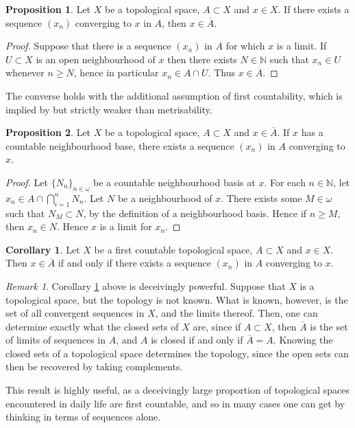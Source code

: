 \documentclass{book}
\theoremstyle{definition}
\newtheorem{proposition}{Proposition}[section]
\newtheorem{corollary}{Corollary}[theorem]
\theoremstyle{remark}
\newtheorem{remark}{Remark}[section]
\newcommand{\N}{\mathbb{N}}
\begin{document}
\begin{proposition}
Let $X$ be a topological space, $A\subset X$ and $x\in X$. If there exists a sequence $(x_n)$ converging to $x$ in $A$, then $x\in \overline A$.
\end{proposition}
\begin{proof}
Suppose that there is a sequence $(x_n)$ in $A$ for which $x$ is a limit. If $U\subset X$ is an open neighbourhood of $x$ then there exists $N\in\N$ such that $x_n\in U$ whenever $n\geq N$, hence in particular $x_n\in A\cap U$. Thus $x\in\overline A$.
\end{proof}

The converse holds with the additional assumption of first countability, which is implied by but strictly weaker than metrisability.

\begin{proposition}
Let $X$ be a topological space, $A\subset X$ and $x\in \overline A$. If $x$ has a countable neighbourhood base, there exists a sequence $(x_n)$ in $A$ converging to $x$.
\end{proposition}
\begin{proof}
Let $\{N_n\}_{n\in\omega}$ be a countable neighbourhood basis at $x$. For each $n\in\N$, let $x_n\in A\cap\bigcap_{i=1}^n N_n$. Let $N$ be a neighbourhood of $x$. There exists some $M\in\omega$ such that $N_M\subset N$, by the definition of a neighbourhood basis. Hence if $n\geq M$, then $x_n\in N$. Hence $x$ is a limit for $x_n$.
\end{proof}
\begin{corollary}\label{first countability sequence result}
Let $X$ be a first countable topological space, $A\subset X$ and $x\in X$. Then $x\in\overline A$ if and only if there exists a sequence $(x_n)$ in $A$ converging to $x$.
\end{corollary}

\begin{remark}\label{first countable spaces determined by sequences}
    Corollary \ref{first countability sequence result} above is deceivingly powerful. Suppose that $X$ is a topological space, but the topology is not known. What is known, however, is the set of all convergent sequences in $X$, and the limits thereof. Then, one can determine exactly what the closed sets of $X$ are, since if $A\subset X$, then $\overline A$ is the set of limits of sequences in $A$, and $A$ is closed if and only if $\overline A=A$. Knowing the closed sets of a topological space determines the topology, since the open sets can then be recovered by taking complements.

    This result is highly useful, as a deceivingly large proportion of topological spaces encountered in daily life are first countable, and so in many cases one can get by thinking in terms of sequences alone.
\end{remark}
\end{document}
